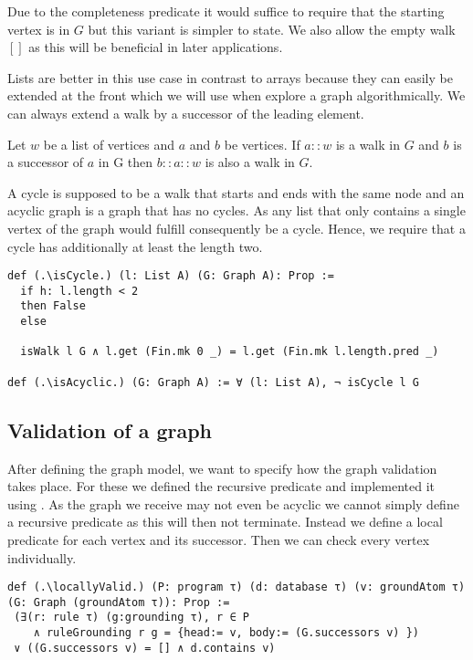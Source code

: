 Due to the completeness predicate it would suffice to require that the starting vertex is in $G$ but this variant is simpler to state. We also allow the empty walk $[]$ as this will be beneficial in later applications.

Lists are better in this use case in contrast to arrays because they can easily be extended at the front which we will use when explore a graph algorithmically. We can always extend a walk by a successor of the leading element.

\begin{lemma}[\isWalkextendssuccessors]
    Let $w$ be a list of vertices and $a$ and $b$ be vertices.
    If $a::w$ is a walk in $G$ and $b$ is a successor of $a$ in G then $b::a::w$ is also a walk in $G$.
\end{lemma}

A cycle is supposed to be a walk that starts and ends with the same node and an acyclic graph is a graph that has no cycles. As any list that only contains a single vertex of the graph would fulfill consequently be a cycle. Hence, we require that a cycle has additionally at least the length two.

\begin{lstlisting}
def (.\isCycle.) (l: List A) (G: Graph A): Prop :=
  if h: l.length < 2
  then False
  else

  isWalk l G ∧ l.get (Fin.mk 0 _) = l.get (Fin.mk l.length.pred _)

def (.\isAcyclic.) (G: Graph A) := ∀ (l: List A), ¬ isCycle l G
\end{lstlisting}

\subsection{Validation of a graph}

After defining the graph model, we want to specify how the graph validation takes place. For these we defined the recursive predicate \isValid and implemented it using \treeValidator. As the graph we receive may not even be acyclic we cannot simply define a recursive predicate as this will then not terminate. Instead we define a local predicate for each vertex and its successor. Then we can check every vertex individually.

\begin{lstlisting}
def (.\locallyValid.) (P: program τ) (d: database τ) (v: groundAtom τ) (G: Graph (groundAtom τ)): Prop :=
 (∃(r: rule τ) (g:grounding τ), r ∈ P 
    ∧ ruleGrounding r g = {head:= v, body:= (G.successors v) }) 
 ∨ ((G.successors v) = [] ∧ d.contains v)
\end{lstlisting}

